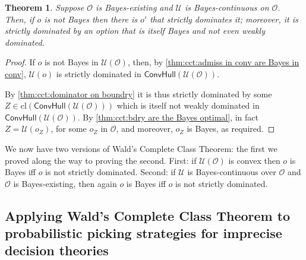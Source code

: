 \documentclass[a4paper]{article}
\newtheorem{theorem}{Theorem}
\newcommand\cl{\mathrm{cl}}
\renewcommand\O{\mathcal{O}}
\newcommand\Uwald{\mathcal{U}} %
\newcommand{\Conv}{\mathsf{ConvHull}}
\newenvironment{CCM rewritten}
{\begingroup\color{blue}} %
{\endgroup}              %
\begin{document}
%		
	\begin{theorem}\label{thm:cct}
		Suppose $\O$ is Bayes-existing and $\Uwald$ is Bayes-continuous on $\O$. Then, if $o$ is not Bayes then there is $o'$ that strictly dominates it; moreover, it is strictly dominated by an option that is itself Bayes and not even weakly dominated. 
	\end{theorem}
\begin{proof}
			If $o$ is not Bayes in $\Uwald(\O)$, then, by \cref{thm:cct:admiss in conv are Bayes in conv}, $\Uwald(o)$ is strictly dominated in $\Conv(\Uwald(\O))$. 
	
	By \cref{thm:cct:dominator on boundry} it is thus strictly dominated by some $Z\in\cl(\Conv(\Uwald(\O)))$ which is itself not weakly dominated in $\Conv(\Uwald(\O))$. By \cref{thm:cct:bdry are the Bayes optimal}, in fact $Z = \Uwald(o_Z)$, for some $o_Z$ in $\O$, and moreover, $o_Z$ is Bayes, as required.
\end{proof}


We now have two versions of Wald's Complete Class Theorem: the first we proved along the way to proving the second. First: if $\Uwald(\O)$ is convex then $o$ is Bayes iff $o$ is not strictly dominated. Second: if $\Uwald$ is Bayes-continuous over $\O$ and $\O$ is Bayes-existing, then again $o$ is Bayes iff $o$ is not strictly dominated.

\subsection{Applying Wald's Complete Class Theorem to probabilistic picking strategies for imprecise decision theories}
\end{document}
